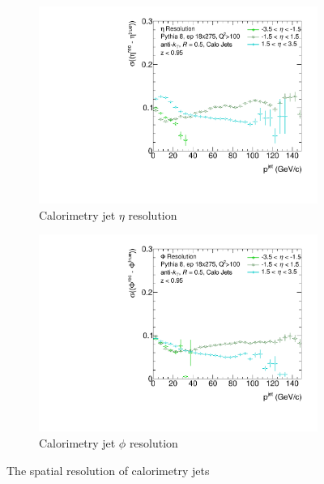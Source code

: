 \begin{figure}
    \centering
    \begin{subfigure}{0.4\textwidth}
        \centering
        \includegraphics[width=\linewidth]{figs/Final_Plots/EtaReso_calo_grouped.pdf}
        \caption{Calorimetry jet $\eta$ resolution}
        \label{fig:calo_eta_resolution}
    \end{subfigure}
    \hfill
    \begin{subfigure}{0.4\textwidth}
        \centering
        \includegraphics[width=\linewidth]{figs/Final_Plots/PhiReso_calo_grouped.pdf}
        \caption{Calorimetry jet $\phi$ resolution}
        \label{fig:calo_phi_resolution}
    \end{subfigure}
    \caption{The spatial resolution of calorimetry jets}
    \label{fig:calo_spatial_reso_scale}
\end{figure}
